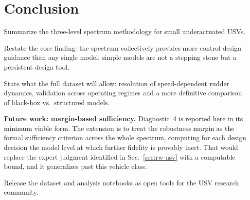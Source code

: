 \documentclass[11pt]{article}
\begin{document}
\section{Conclusion}
\label{sec:conclusion}

\begin{outline}
\item Summarize the three-level spectrum methodology for small underactuated USVs.
\item Restate the core finding: the spectrum collectively provides more control
  design guidance than any single model; simple models are not a stepping stone but
  a persistent design tool.
\item State what the full dataset will allow: resolution of speed-dependent rudder
  dynamics, validation across operating regimes and a more definitive comparison of
  black-box vs.\ structured models.
\item \textbf{Future work: margin-based sufficiency.} Diagnostic~4 is reported here in
  its minimum viable form. The extension is to treat the robustness margin as the
  formal sufficiency criterion across the whole spectrum, computing for each design
  decision the model level at which further fidelity is provably inert. That would
  replace the expert judgment identified in Sec.~\ref{sec:rw-usv} with a computable
  bound, and it generalizes past this vehicle class.
\item Release the dataset and analysis notebooks as open tools for the USV research
  community.
\end{outline}

\nocite{*}


\end{document}
